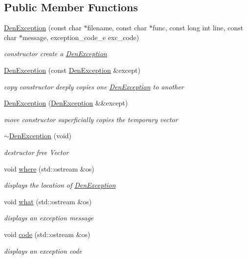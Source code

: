 \subsection*{Public Member Functions}
\begin{DoxyCompactItemize}
\item 
\hyperlink{classDenException_a126de088ce459641b0793bd754f4d171}{Den\+Exception} (const char $\ast$filename, const char $\ast$func, const long int line, const char $\ast$message, exception\+\_\+code\+\_\+e exc\+\_\+code)
\begin{DoxyCompactList}\small\item\em constructor  create a \hyperlink{classDenException}{Den\+Exception} \end{DoxyCompactList}\item 
\hyperlink{classDenException_a515eeb5f86c2ed600a484b2653b10e48}{Den\+Exception} (const \hyperlink{classDenException}{Den\+Exception} \&except)
\begin{DoxyCompactList}\small\item\em copy constructor  deeply copies one \hyperlink{classDenException}{Den\+Exception} to another \end{DoxyCompactList}\item 
\hyperlink{classDenException_a6e21462a638a18d3af11e183bbb2e441}{Den\+Exception} (\hyperlink{classDenException}{Den\+Exception} \&\&except)
\begin{DoxyCompactList}\small\item\em move constructor  superficially copies the temporary vector \end{DoxyCompactList}\item 
\mbox{\label{classDenException_a90812cb3af8ed4794c411b575c30c5c0}} 
\hyperlink{classDenException_a90812cb3af8ed4794c411b575c30c5c0}{$\sim$\+Den\+Exception} (void)
\begin{DoxyCompactList}\small\item\em destructor  free Vector \end{DoxyCompactList}\item 
void \hyperlink{classDenException_a9ea40d7917b2148f9183ce63bde612a8}{where} (std\+::ostream \&os)
\begin{DoxyCompactList}\small\item\em displays the location of \hyperlink{classDenException}{Den\+Exception} \end{DoxyCompactList}\item 
void \hyperlink{classDenException_a52785aeb451bf203cda123c8dcc9d64e}{what} (std\+::ostream \&os)
\begin{DoxyCompactList}\small\item\em displays an exception message \end{DoxyCompactList}\item 
void \hyperlink{classDenException_a81eaeb9c2f6845516f25ead861040a93}{code} (std\+::ostream \&os)
\begin{DoxyCompactList}\small\item\em displays an exception code \end{DoxyCompactList}\end{DoxyCompactItemize}
